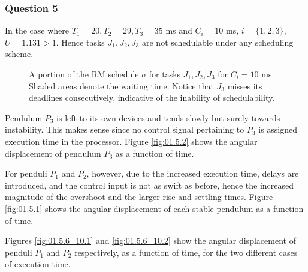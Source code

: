 \subsubsection{Question 5}
In the case where $T_1 = 20, T_2 = 29, T_3 = 35$ ms and $C_i = 10$ ms,
$i=\{1,2,3\}$, $U=1.131 > 1$. Hence tasks $J_1, J_2, J_3$ are not schedulable
under any scheduling scheme.


\begin{figure}[H]\centering
  \scalebox{0.7}{}
  \caption{A portion of the RM schedule $\sigma$ for tasks $J_1, J_2, J_3$ for
    $C_i = 10$ ms.  Shaded areas denote the waiting time. Notice that $J_3$
    misses its deadlines consecutively, indicative of the inability of
    schedulability.}
\end{figure}

Pendulum $P_3$ is left to its own devices and tends slowly but surely towards
instability. This makes sense since no control signal pertaining to $P_3$ is
assigned execution time in the processor. Figure \ref{fig:01.5.2} shows the
angular displacement of pendulum $P_3$ as a function of time.

For penduli $P_1$ and $P_2$, however, due to the increased execution time,
delays are introduced, and the control input is not as swift as before,
hence the increased magnitude of the overshoot and the larger rise and settling
times. Figure \ref{fig:01.5.1} shows the angular displacement of each stable
pendulum as a function of time.

Figures \ref{fig:01.5.6_10.1} and \ref{fig:01.5.6_10.2} show the angular
displacement of penduli $P_1$ and $P_2$ respectively, as a function of time, for
the two different cases of execution time.


\noindent{}




